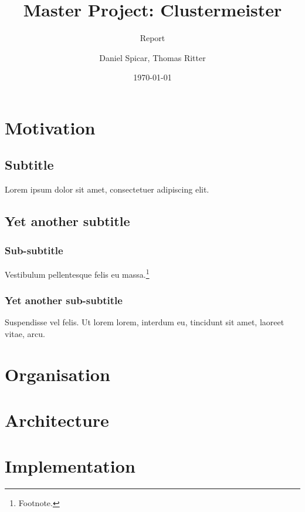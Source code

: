 \documentclass[english]{uzhpub}
\begin{document}
\title{Master Project: Clustermeister}

\subtitle{Report}

\author{Daniel Spicar, Thomas Ritter}

\date{\today}

\maketitle

\section{Motivation}

\subsection{Subtitle}

Lorem ipsum dolor sit amet, consectetuer adipiscing elit.

\subsection{Yet another subtitle}

\subsubsection{Sub-subtitle}

Vestibulum pellentesque felis eu massa.\footnote{Footnote.}

\subsubsection{Yet another sub-subtitle}

Suspendisse vel felis. Ut lorem lorem, interdum eu, tincidunt sit
amet, laoreet vitae, arcu.

\section{Organisation}



\section{Architecture}



\section{Implementation}
\end{document}
